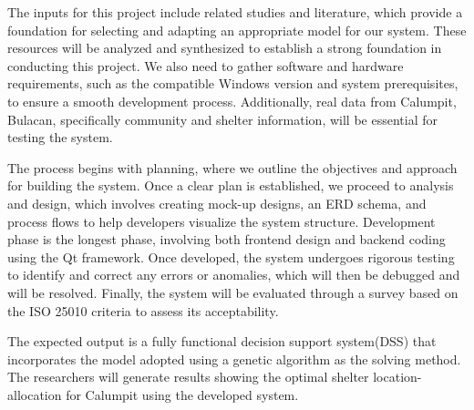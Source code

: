 	The inputs for this project include related studies and literature, which provide a foundation for selecting and adapting an appropriate model for our system. These resources will be analyzed and synthesized to establish a strong foundation in conducting this project. We also need to gather software and hardware requirements, such as the compatible Windows version and system prerequisites, to ensure a smooth development process. Additionally, real data from Calumpit, Bulacan, specifically community and shelter information, will be essential for testing the system.
	
	The process begins with planning, where we outline the objectives and approach for building the system. Once a clear plan is established, we proceed to analysis and design, which involves creating mock-up designs, an ERD schema, and process flows to help developers visualize the system structure. Development phase is the longest phase, involving both frontend design and backend coding using the Qt framework. Once developed, the system undergoes rigorous testing to identify and correct any errors or anomalies, which will then be debugged and will be resolved. Finally, the system will be evaluated through a survey based on the ISO 25010 criteria to assess its acceptability.
	
	The expected output is a fully functional decision support system(DSS) that incorporates the  model adopted using a genetic algorithm as the solving method. The researchers will generate results showing the optimal shelter location-allocation for Calumpit using the developed system.
	


